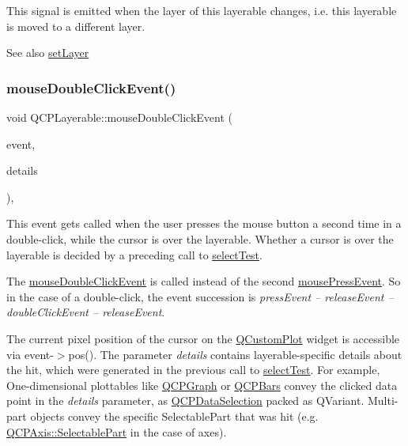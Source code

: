 This signal is emitted when the layer of this layerable changes, i.\+e. this layerable is moved to a different layer.

\begin{DoxySeeAlso}{See also}
\mbox{\hyperlink{class_q_c_p_layerable_ab0d0da6d2de45a118886d2c8e16d5a54}{set\+Layer}} 
\end{DoxySeeAlso}
\mbox{\label{class_q_c_p_layerable_a4171e2e823aca242dd0279f00ed2de81}} 
\subsubsection{\texorpdfstring{mouseDoubleClickEvent()}{mouseDoubleClickEvent()}}
{\footnotesize\ttfamily void Q\+C\+P\+Layerable\+::mouse\+Double\+Click\+Event (\begin{DoxyParamCaption}\item[{Q\+Mouse\+Event $\ast$}]{event,  }\item[{const Q\+Variant \&}]{details }\end{DoxyParamCaption})\hspace{0.3cm}{\ttfamily [protected]}, {\ttfamily [virtual]}}

This event gets called when the user presses the mouse button a second time in a double-\/click, while the cursor is over the layerable. Whether a cursor is over the layerable is decided by a preceding call to \mbox{\hyperlink{class_q_c_p_layerable_a04db8351fefd44cfdb77958e75c6288e}{select\+Test}}.

The \mbox{\hyperlink{class_q_c_p_layerable_a4171e2e823aca242dd0279f00ed2de81}{mouse\+Double\+Click\+Event}} is called instead of the second \mbox{\hyperlink{class_q_c_p_layerable_af6567604818db90f4fd52822f8bc8376}{mouse\+Press\+Event}}. So in the case of a double-\/click, the event succession is {\itshape press\+Event -- release\+Event -- double\+Click\+Event -- release\+Event}.

The current pixel position of the cursor on the \mbox{\hyperlink{class_q_custom_plot}{Q\+Custom\+Plot}} widget is accessible via {\ttfamily event-\/$>$pos()}. The parameter {\itshape details} contains layerable-\/specific details about the hit, which were generated in the previous call to \mbox{\hyperlink{class_q_c_p_layerable_a04db8351fefd44cfdb77958e75c6288e}{select\+Test}}. For example, One-\/dimensional plottables like \mbox{\hyperlink{class_q_c_p_graph}{Q\+C\+P\+Graph}} or \mbox{\hyperlink{class_q_c_p_bars}{Q\+C\+P\+Bars}} convey the clicked data point in the {\itshape details} parameter, as \mbox{\hyperlink{class_q_c_p_data_selection}{Q\+C\+P\+Data\+Selection}} packed as Q\+Variant. Multi-\/part objects convey the specific {\ttfamily Selectable\+Part} that was hit (e.\+g. \mbox{\hyperlink{class_q_c_p_axis_abee4c7a54c468b1385dfce2c898b115f}{Q\+C\+P\+Axis\+::\+Selectable\+Part}} in the case of axes).

